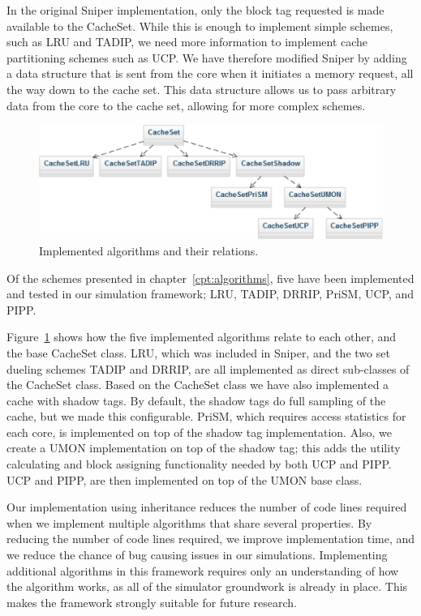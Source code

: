 In the original Sniper implementation, only the block tag requested is made available to the CacheSet. 
While this is enough to implement simple schemes, such as LRU and TADIP, we need more information to implement cache partitioning schemes such as UCP.
We have therefore modified Sniper by adding a data structure that is sent from the core when it initiates a memory request, all the way down to the cache set.
This data structure allows us to pass arbitrary data from the core to the cache set, allowing for more complex schemes.

\begin{figure}[ht]
\centering
\includegraphics{figures/framework/algorithms}
\caption{Implemented algorithms and their relations.}
\label{fig:framework:implementation:algorithms}
\end{figure}

Of the schemes presented in chapter~\ref{cpt:algorithms}, five have been implemented and tested in our simulation framework; LRU, TADIP, DRRIP, PriSM, UCP, and PIPP.

Figure~\ref{fig:framework:implementation:algorithms} shows how the five implemented algorithms relate to each other, and the base CacheSet class.
LRU, which was included in Sniper, and the two set dueling schemes TADIP and DRRIP, are all implemented as direct sub-classes of the CacheSet class.
Based on the CacheSet class we have also implemented a cache with shadow tags.
By default, the shadow tags do full sampling of the cache, but we made this configurable.
PriSM, which requires access statistics for each core, is implemented on top of the shadow tag implementation.
Also, we create a UMON implementation on top of the shadow tag; this adds the utility calculating and block assigning functionality needed by both UCP and PIPP.
UCP and PIPP, are then implemented on top of the UMON base class.

Our implementation using inheritance reduces the number of code lines required when we implement multiple algorithms that share several properties.
By reducing the number of code lines required, we improve implementation time, and we reduce the chance of bug causing issues in our simulations.
Implementing additional algorithms in this framework requires only an understanding of how the algorithm works, as all of the simulator groundwork is already in place.
This makes the framework strongly suitable for future research.

